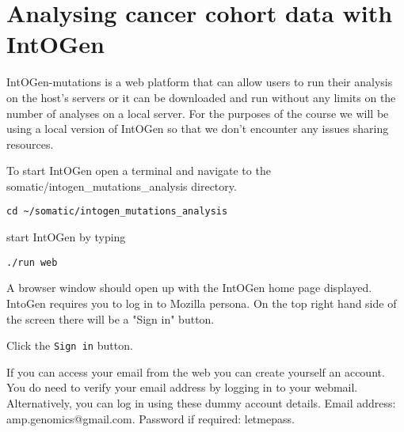 
\section{Analysing cancer cohort data with IntOGen}

\begin{information}
IntOGen-mutations is a web platform that can allow users to run their analysis on the
host's servers or it can be downloaded and run without any limits on the number of
analyses on a local server.
\vspace{4 mm}
For the purposes of the course we will be using a local version of IntOGen so that we
don't encounter any issues sharing resources.
\end{information}

\begin{steps}
To start IntOGen open a terminal and navigate to the somatic/intogen\_mutations\_analysis directory.
\begin{lstlisting}
cd ~/somatic/intogen_mutations_analysis
\end{lstlisting}
\vspace{4 mm}
start IntOGen by typing
\begin{lstlisting}
./run web
\end{lstlisting}
\end{steps}

\begin{information}
A browser window should open up with the IntOGen home page displayed. 
IntoGen requires you to log in to Mozilla persona.
\vspace{4 mm}
On the top right hand side of the screen there will be a "Sign in" button.
\end{information}

\begin{steps}
Click the \texttt{Sign in} button.
\end{steps}

If you can access your email from the web you can create yourself an account. 
You do need to verify your email address by logging in to your webmail.
\vspace{4 mm}
Alternatively, you can log in using these dummy account details.
\hspace{5mm} Email address:\hspace{10mm} amp.genomics@gmail.com.
\hspace{5mm} Password if required:\hspace{5mm} letmepass.

